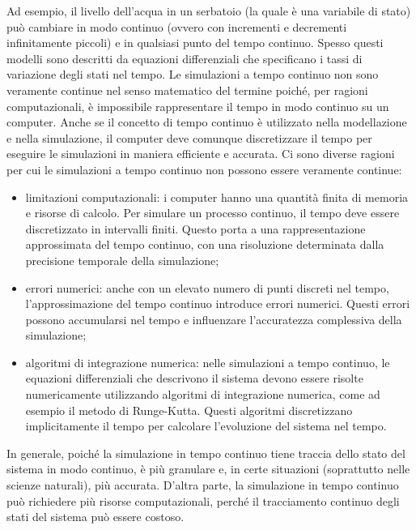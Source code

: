 \documentclass[12pt,a4paper,openright,twoside]{book}
\begin{document}
Ad esempio, il livello dell'acqua in un serbatoio (la quale è una variabile di stato) può cambiare in modo continuo (ovvero con incrementi e decrementi infinitamente piccoli) e in qualsiasi punto del tempo continuo. Spesso questi modelli sono descritti da equazioni differenziali che specificano i tassi di variazione degli stati nel tempo.
Le simulazioni a tempo continuo non sono veramente continue nel senso matematico del termine poiché, per ragioni computazionali, è impossibile rappresentare il tempo in modo continuo su un computer. Anche se il concetto di tempo continuo è utilizzato nella modellazione e nella simulazione, il computer deve comunque discretizzare il tempo per eseguire le simulazioni in maniera efficiente e accurata.
Ci sono diverse ragioni per cui le simulazioni a tempo continuo non possono essere veramente continue:
\begin{itemize}
    \item limitazioni computazionali: i computer hanno una quantità finita di memoria e risorse di calcolo. Per simulare un processo continuo, il tempo deve essere discretizzato in intervalli finiti. Questo porta a una rappresentazione approssimata del tempo continuo, con una risoluzione determinata dalla precisione temporale della simulazione;
    \item errori numerici: anche con un elevato numero di punti discreti nel tempo, l'approssimazione del tempo continuo introduce errori numerici. Questi errori possono accumularsi nel tempo e influenzare l'accuratezza complessiva della simulazione;
    \item algoritmi di integrazione numerica: nelle simulazioni a tempo continuo, le equazioni differenziali che descrivono il sistema devono essere risolte numericamente utilizzando algoritmi di integrazione numerica, come ad esempio il metodo di Runge-Kutta. Questi algoritmi discretizzano implicitamente il tempo per calcolare l'evoluzione del sistema nel tempo.
\end{itemize}

In generale, poiché la simulazione in tempo continuo tiene traccia dello stato del sistema in modo continuo, è più granulare e, in certe situazioni (soprattutto nelle scienze naturali), più accurata. D'altra parte, la simulazione in tempo continuo può richiedere più risorse computazionali, perché il tracciamento continuo degli stati del sistema può essere costoso.
\end{document}
